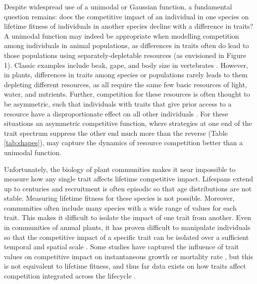 \documentclass[a4paper,11pt]{article}
\begin{document}
Despite widespread use of a unimodal or Gaussian function, a fundamental question remains: does the competitive impact of an individual in one species on lifetime fitness of individuals in another species decline with a difference in traits? A unimodal function may indeed be appropriate when modelling competition among individuals in animal populations, as differences in traits often do lead to those populations using separately-depletable resources (as envisioned in Figure 1). Classic examples include beak, gape, and body size in vertebrates \citep{Schluter-1984, Schluter-2000a}. However, in plants, differences in traits among species or populations rarely leads to them depleting different resources, as all require the same few basic resources of light, water, and nutrients. Further, competition for these resources is often thought to be asymmetric, such that individuals with traits that give prior access to a resource have a disproportionate effect on all other individuals \citep{Law-1997}. For these situations an asymmetric competitive function, where strategies at one end of the trait spectrum suppress the other end much more than the reverse (Table \ref{tab:shapes}), may capture the dynamics of resource competition better than a unimodal function.

Unfortunately, the biology of plant communities makes it near impossible to measure how any single trait affects lifetime competitive impact. Lifespans extend up to centuries and recruitment is often episodic so that age distributions are not stable. Measuring lifetime fitness for these species is not possible. Moreover, communities often include many species with a wide range of values for each trait. This makes it difficult to isolate the impact of one trait from another. Even in communities of annual plants, it has proven difficult to manipulate individuals so that the competitive impact of a specific trait can be isolated over a sufficient temporal and spatial scale \citep{Kraft-2015}. Some studies have captured the influence of trait values on competitive impact on instantaneous growth or mortality rate \citep{Uriarte-2010, Kunstler-2012, Kunstler-2016, Fort-2014}, but this is not equivalent to lifetime fitness, and thus far data exists on how traits affect competition integrated across the lifecycle \citep{Laughlin-2020}.
\end{document}
